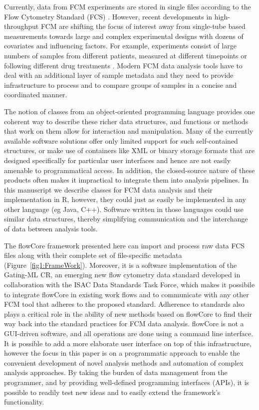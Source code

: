 \documentclass[12pt]{article}
\newcommand{\Rpackage}[1]{{\textsf{#1}}}
\begin{document}
Currently, data from FCM experiments are stored in single files
according to the Flow Cytometry Standard (FCS) \citep{seamer1997pnd}.
However, recent developments in high-throughput FCM are shifting the
focus of interest away from single-tube based measurements towards
large and complex experimental designs with dozens of covariates and
influencing factors. For example, experiments consist of large numbers
of samples from different patients, measured at different timepoints
\citep{brinkman2007hcf} or following different drug treatments
\citep{gasparetto2004ice}. Modern FCM data analysis tools have to deal
with an additional layer of sample metadata and they need to provide
infrastructure to process and to compare groups of samples in a
concise and coordinated manner.

The notion of classes from an object-oriented programming language
provides one coherent way to describe these richer data structures,
and functions or methods that work on them allow for interaction and
manipulation. Many of the currently available software solutions offer
only limited support for such self-contained structures, or make use
of containers like XML or binary storage formats that are designed
specifically for particular user interfaces and hence are not easily
amenable to programmatical access. In addition, the closed-source
nature of these products often makes it impractical to integrate them
into analysis pipelines. In this manuscript we describe classes for
FCM data analysis and their implementation in R, however, they could
just as easily be implemented in any other language (eg Java,
C++). Software written in those languages could use similar data
structures, thereby simplifying communication and the interchange of
data between analysis tools.

The \Rpackage{flowCore} framework presented here can import and
process raw data FCS files along with their complete set of
file-specific metadata (Figure~\ref{fig1:FrameWork}).  Moreover, it is
a software implementation of the Gating-ML CR, an emerging new flow
cytometry data standard developed in collaboration with the ISAC Data
Standards Task Force, which makes it possibile to integrate
\Rpackage{flowCore} in existing work flows and to communicate with any
other FCM tool that adheres to the proposed standard. Adherence to
standards also plays a critical role in the ability of new methods
based on \Rpackage{flowCore} to find their way back into the standard
practices for FCM data analysis. \Rpackage{flowCore} is not a
GUI-driven software, and all operations are done using a command line
interface.  It is possible to add a more elaborate user interface on
top of this infrastructure, however the focus in this paper is on a
programmatic approach to enable the convenient development of novel
analysis methods and automation of complex analysis approaches.  By
taking the burden of data management from the programmer, and by
providing well-defined programming interfaces (APIs), it is possible
to readily test new ideas and to easily extend the framework's
functionality.
\end{document}
